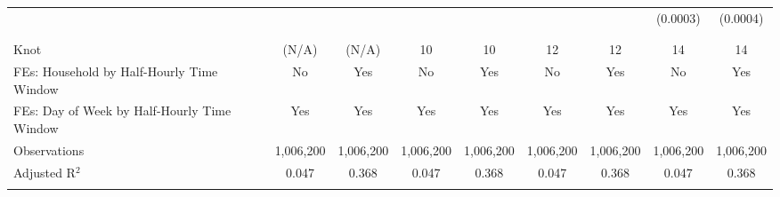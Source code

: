 \begin{table}[!htbp]
\begin{longtable}{@{\extracolsep{0pt}}lcccccccc}
  &  &  &  &  &  &  & (0.0003) & (0.0004) \\ 
  & & & & & & & & \\ 
\hline \\[-1.8ex] 
Knot & (N/A) & (N/A) & 10 & 10 & 12 & 12 & 14 & 14 \\ 
FEs: Household by Half-Hourly Time Window & No & Yes & No & Yes & No & Yes & No & Yes \\ 
FEs: Day of Week by Half-Hourly Time Window & Yes & Yes & Yes & Yes & Yes & Yes & Yes & Yes \\ 
Observations & 1,006,200 & 1,006,200 & 1,006,200 & 1,006,200 & 1,006,200 & 1,006,200 & 1,006,200 & 1,006,200 \\ 
Adjusted R$^{2}$ & 0.047 & 0.368 & 0.047 & 0.368 & 0.047 & 0.368 & 0.047 & 0.368 \\ 
\hline 
\hline \\[-1.8ex] 
\end{longtable} 
\end{table} 

